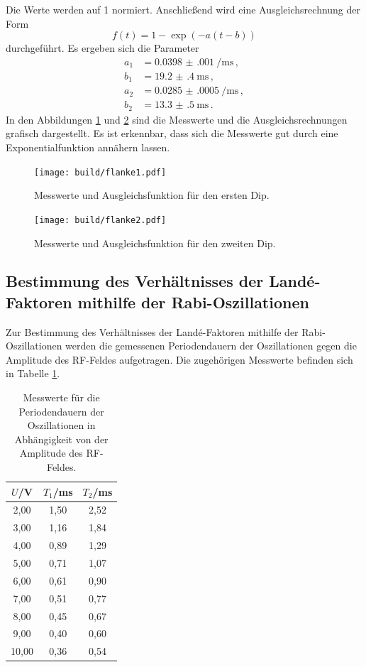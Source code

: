 Die Werte werden auf 1 normiert. Anschließend wird eine Ausgleichsrechnung der Form
\begin{equation*}
  f(t)=1-\exp(-a(t-b))
\end{equation*}
durchgeführt. Es ergeben sich die Parameter
\begin{align*}
  a_1&=\SI{0.0398(0010)}{\per\milli\second} \,,\\
  b_1&=\SI{19.2(4)}{\milli\second} \,,\\
  a_2&=\SI{0.0285(0005)}{\per\milli\second}\,,\\
  b_2&=\SI{13.3(5)}{\milli\second} \,.
\end{align*}
In den Abbildungen \ref{fig:flankefit1} und \ref{fig:flankefit2} sind die Messwerte und die
Ausgleichsrechnungen grafisch dargestellt. Es ist erkennbar, dass sich die Messwerte gut
durch eine Exponentialfunktion annähern lassen.

\begin{figure}
  \centering
  \texttt{[image: build/flanke1.pdf]}
  \caption{Messwerte und Ausgleichsfunktion für den ersten Dip.}
  \label{fig:flankefit1}
\end{figure}
\begin{figure}
  \centering
  \texttt{[image: build/flanke2.pdf]}
  \caption{Messwerte und Ausgleichsfunktion für den zweiten Dip.}
  \label{fig:flankefit2}
\end{figure}

\newpage
\subsection{Bestimmung des Verhältnisses der Landé-Faktoren mithilfe der Rabi-Oszillationen}
\label{subsec:oszillationen}
Zur Bestimmung des Verhältnisses der Landé-Faktoren mithilfe der Rabi-Oszillationen werden
die gemessenen Periodendauern der Oszillationen gegen die Amplitude des RF-Feldes aufgetragen.
Die zugehörigen Messwerte befinden sich in Tabelle \ref{tab:oszi}.

\begin{table}[htp]
	\begin{center}
    \caption{Messwerte für die Periodendauern der Oszillationen in Abhängigkeit von der Amplitude des RF-Feldes.}
    \label{tab:oszi}
		\begin{tabular}{ccc}
		\toprule
			{$U$/V} & {$T_1$/ms} & {$T_2$/ms}\\
			\midrule
			2,00 & 1,50 & 2,52\\
			3,00 & 1,16 & 1,84\\
			4,00 & 0,89 & 1,29\\
			5,00 & 0,71 & 1,07\\
			6,00 & 0,61 & 0,90\\
			7,00 & 0,51 & 0,77\\
			8,00 & 0,45 & 0,67\\
			9,00 & 0,40 & 0,60\\
			10,00 & 0,36 & 0,54\\
		\bottomrule
		\end{tabular}
	\end{center}
\end{table}

